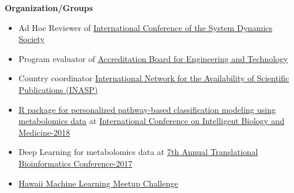 
\textbf{Organization/Groups}
\begin{itemize}
\tightlist
\item
  Ad Hoc Reviewer of
  \href{https://www.systemdynamics.org/conference}{International Conference of the System Dynamics Society}
\item
  Program evaluator  of \href{https://www.abet.edu}{Accreditation Board for Engineering and Technology
}
\item
 Country coordinator
  \href{https://www.inasp.info/}{International Network for the Availability of Scientific Publications (INASP)
}
\end{itemize}

\begin{itemize}
\tightlist
\item
  \href{https://github.com/FADHLyemen/lilikoi_Fadhl}{R package for personalized pathway-based classification modeling using metabolomics data} at
  \href{http://icibm2018.zhaobioinfo.org/}{International Conference on Intelligent Biology and Medicine-2018}
\item
  Deep Learning for metabolomics data at \href{https://ritchielab.org/tbc2017}{7th Annual Translational Bioinformatics Conference-2017}


\end{itemize}


\begin{itemize}
\tightlist
\item
  \href{https://www.kaggle.com/c/hawaiiml0}{Hawaii Machine Learning Meetup Challenge}

\end{itemize}
